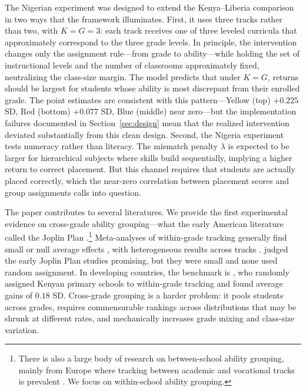 \documentclass[11pt]{article}
\begin{document}
The Nigerian experiment was designed to extend the Kenya--Liberia comparison in two ways that the framework illuminates. First, it uses three tracks rather than two, with $K = G = 3$: each track receives one of three leveled curricula that approximately correspond to the three grade levels. In principle, the intervention changes only the assignment rule---from grade to ability---while holding the set of instructional levels and the number of classrooms approximately fixed, neutralizing the class-size margin. The model predicts that under $K = G$, returns should be largest for students whose ability is most discrepant from their enrolled grade. The point estimates are consistent with this pattern---Yellow (top) $+0.225$ SD, Red (bottom) $+0.077$ SD, Blue (middle) near zero---but the implementation failures documented in Section~\ref{sec:design} mean that the realized intervention deviated substantially from this clean design. Second, the Nigeria experiment tests numeracy rather than literacy. The mismatch penalty $\lambda$ is expected to be larger for hierarchical subjects where skills build sequentially, implying a higher return to correct placement. But this channel requires that students are actually placed correctly, which the near-zero correlation between placement scores and group assignments calls into question.

The paper contributes to several literatures. We provide the first experimental evidence on cross-grade ability grouping---what the early American literature called the Joplin Plan \citep{floyd:1954}.\footnote{There is also a large body of research on between-school ability grouping, mainly from Europe where tracking between academic and vocational tracks is prevalent \citep{fu2018ability,lavrijsen2015new}. We focus on within-school ability grouping.} Meta-analyses of within-grade tracking generally find small or null average effects \citep{slavin:1987,slavin1990achievement,kulik1987effects,terrin2022effect}, with heterogeneous results across tracks \citep{burke2013classroom,hoxby2005taking,antecol2016peer,garlick,de2022college}. \citet{slavin:1987} judged the early Joplin Plan studies promising, but they were small and none used random assignment. In developing countries, the benchmark is \citet{duflo2011peer}, who randomly assigned Kenyan primary schools to within-grade tracking and found average gains of $0.18$ SD. Cross-grade grouping is a harder problem: it pools students across grades, requires commensurable rankings across distributions that may be shrunk at different rates, and mechanically increases grade mixing and class-size variation.
\end{document}
